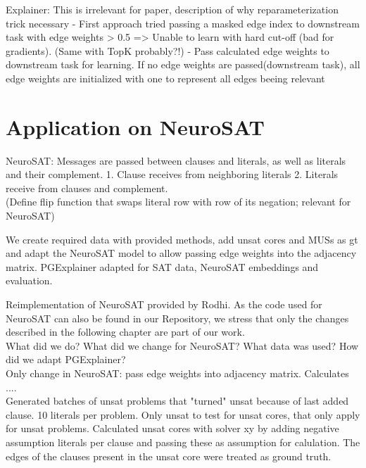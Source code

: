  Explainer:
 This is irrelevant for paper, description of why reparameterization trick necessary
 - First approach tried passing a masked edge index to downstream task with edge weights > 0.5
 => Unable to learn with hard cut-off (bad for gradients). (Same with TopK probably?!)
 - Pass calculated edge weights to downstream task for learning. If no edge weights are passed(downstream task), all edge weights are initialized with one to represent all edges beeing relevant
 

\section{Application on NeuroSAT}
NeuroSAT: Messages are passed between clauses and literals, as well as literals and their complement. 1. Clause receives from neighboring literals 2. Literals receive from clauses and complement. \\
(Define flip function that swaps literal row with row of its negation; relevant for NeuroSAT)

We create required data with provided methods, add unsat cores and MUSs as gt and adapt the NeuroSAT model to allow passing edge weights into the adjacency matrix. PGExplainer adapted for SAT data, NeuroSAT embeddings and evaluation.


Reimplementation of NeuroSAT provided by Rodhi. As the code used for NeuroSAT can also be found in our Repository, we stress that only the changes described in the following chapter are part of our work. \\

What did we do? What did we change for NeuroSAT? What data was used? How did we adapt PGExplainer? \\

Only change in NeuroSAT: pass edge weights into adjacency matrix. Calculates .... \\
Generated batches of unsat problems that "turned" unsat because of last added clause. 10 literals per problem. Only unsat to test for unsat cores, that only apply for unsat problems. Calculated unsat cores with solver xy by adding negative assumption literals per clause and passing these as assumption for calulation. The edges of the clauses present in the unsat core were treated as ground truth. \\

